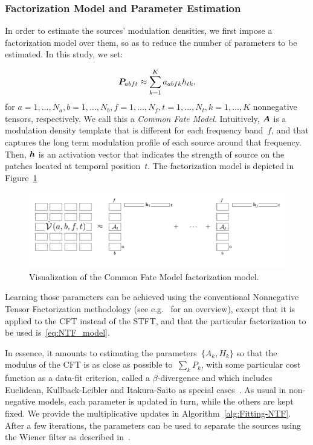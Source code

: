 \subsubsection{Factorization Model and Parameter Estimation}
\label{sub:NTF}

In order to estimate the sources' modulation densities, we first impose
a factorization model over them, so as to reduce the number of parameters
to be estimated. In this study, we set:

\begin{equation}
{\bm{P}}_{abft} \approx \sum_{k=1}^{K}a_{abfk}h_{tk},\label{eq:NTF_model}
\end{equation}
for  $a = 1 , \ldots , N_a, b = 1 , \ldots , N_b, f = 1 , \ldots , N_f , t = 1 , \ldots , N_t , k = 1 , \ldots , K$
nonnegative tensors, respectively. We call this a \emph{Common Fate
Model}. Intuitively, ${\bm{A}}$ is a modulation density template that
is different for each frequency band~$f$, and that captures the
long term modulation profile of each source around that frequency.
Then, ${\bm{h}}$ is an activation vector that indicates the strength
of source on the patches located at temporal position~$t$.
The factorization model is depicted in Figure~\ref{fig:cfm}

\begin{figure}[!htbp]
\centering
\includegraphics[width=0.66\columnwidth]{Chapters/06_Separation_Unknown/figures/cfm.pdf}
\caption{Visualization of the Common Fate Model factorization model.}
\label{fig:cfm}
\end{figure}



Learning those parameters can be achieved using the conventional Nonnegative
Tensor Factorization methodology (see e.g.~\cite{cichoki09,ozerov12,smaragdis14}
for an overview), except that it is applied to the CFT instead of the STFT,
and that the particular factorization to be used is~\eqref{eq:NTF_model}.

In essence, it amounts to estimating the parameters~$\{ A_{k},H_{k}\} $
so that the modulus of the CFT is
as close as possible to~$\sum_{k}P_{k}$, with some particular
cost function as a data-fit criterion, called a $\beta$-divergence
and which includes Euclidean, Kullback-Leibler and Itakura-Saito as
special cases~\cite{fitzgerald08a}. As usual in non-negative models,
each parameter is updated in turn, while the others are kept fixed.
We provide the multiplicative updates in Algorithm~\ref{alg:Fitting-NTF}.
After a few iterations, the parameters can be used to separate the sources using the Wiener filter as described in~\cite{liutkus15}.

